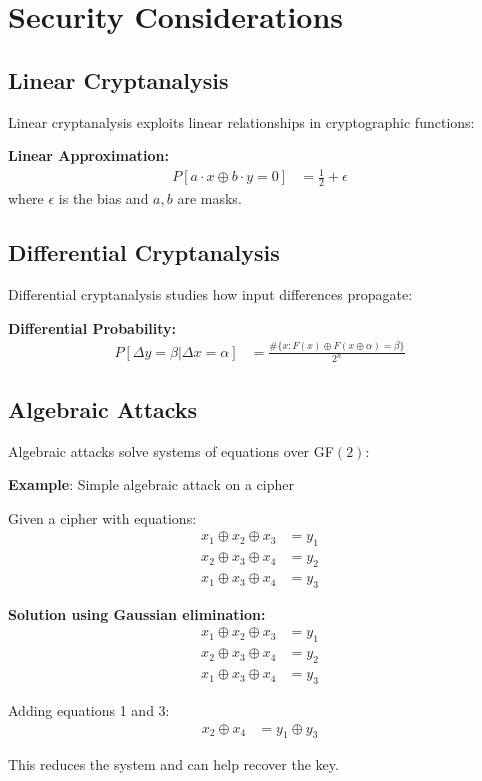 \documentclass[11pt,a4paper]{article}
\begin{document}
\section{Security Considerations}

\subsection{Linear Cryptanalysis}

Linear cryptanalysis exploits linear relationships in cryptographic functions:

\begin{theorybox}
\textbf{Linear Approximation:}
\begin{align*}
P[a \cdot x \oplus b \cdot y = 0] &= \frac{1}{2} + \epsilon
\end{align*}
where $\epsilon$ is the bias and $a, b$ are masks.
\end{theorybox}

\subsection{Differential Cryptanalysis}

Differential cryptanalysis studies how input differences propagate:

\begin{theorybox}
\textbf{Differential Probability:}
\begin{align*}
P[\Delta y = \beta | \Delta x = \alpha] &= \frac{\#\{x : F(x) \oplus F(x \oplus \alpha) = \beta\}}{2^n}
\end{align*}
\end{theorybox}

\subsection{Algebraic Attacks}

Algebraic attacks solve systems of equations over GF$(2)$:

\begin{examplebox}
\textbf{Example}: Simple algebraic attack on a cipher

Given a cipher with equations:
\begin{align*}
x_1 \oplus x_2 \oplus x_3 &= y_1 \\
x_2 \oplus x_3 \oplus x_4 &= y_2 \\
x_1 \oplus x_3 \oplus x_4 &= y_3
\end{align*}

\textbf{Solution using Gaussian elimination:}
\begin{align*}
x_1 \oplus x_2 \oplus x_3 &= y_1 \\
x_2 \oplus x_3 \oplus x_4 &= y_2 \\
x_1 \oplus x_3 \oplus x_4 &= y_3
\end{align*}

Adding equations 1 and 3:
\begin{align*}
x_2 \oplus x_4 &= y_1 \oplus y_3
\end{align*}

This reduces the system and can help recover the key.
\end{examplebox}
\end{document}
